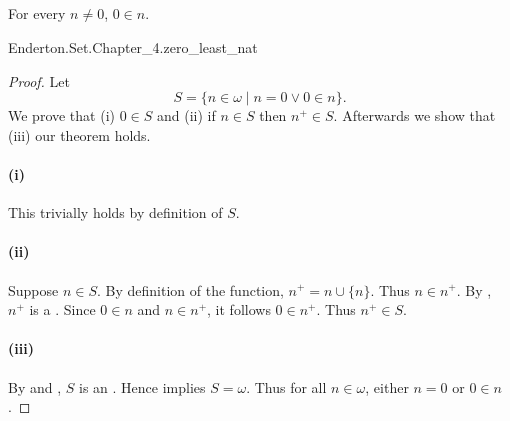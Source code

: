 \documentclass{report}
\begin{document}
\subsection{}%

  \begin{lemma}
    For every  $n \neq 0$, $0 \in n$.
  \end{lemma}

    {Enderton.Set.Chapter\_4.zero\_least\_nat}


  \begin{proof}

    Let $$S = \{n \in \omega \mid n = 0 \lor 0 \in n\}.$$
    We prove that (i) $0 \in S$ and (ii) if $n \in S$ then $n^+ \in S$.
    Afterwards we show that (iii) our theorem holds.

    \paragraph{(i)}%

      This trivially holds by definition of $S$.

    \paragraph{(ii)}%

      Suppose $n \in S$.
      By definition of the  function,
        $n^+ = n \cup \{n\}$.
      Thus $n \in n^+$.
      By , $n^+$ is a .
      Since $0 \in n$ and $n \in n^+$, it follows $0 \in n^+$.
      Thus $n^+ \in S$.

    \paragraph{(iii)}%

      By  and
        , $S$ is an
        .
      Hence  implies $S = \omega$.
      Thus for all $n \in \omega$, either $n = 0$ or $0 \in n$.

  \end{proof}
\end{document}
